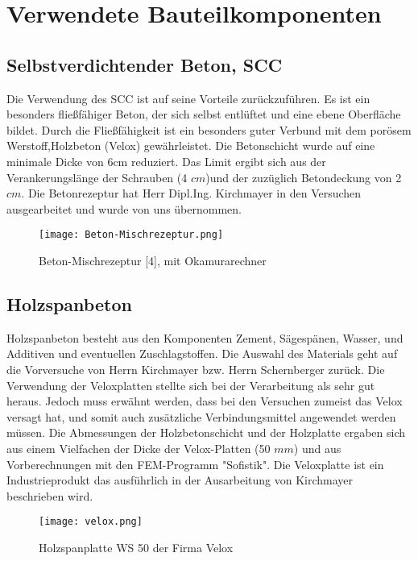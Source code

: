 \documentclass[12 pt,a4 paper ]{scrreprt}
\begin{document}
\section{Verwendete Bauteilkomponenten}
\subsection{Selbstverdichtender Beton, SCC}

Die Verwendung des SCC ist auf seine Vorteile zurückzuführen. Es ist ein besonders fließfähiger Beton, der sich selbst entlüftet und eine ebene Oberfläche bildet. Durch die Fließfähigkeit ist ein besonders guter Verbund mit dem porösem Werstoff,Holzbeton (Velox) gewährleistet. Die Betonschicht wurde auf eine minimale Dicke von 6cm reduziert. Das Limit ergibt sich aus der Verankerungslänge der Schrauben (4 $cm$)und der zuzüglich  Betondeckung von 2 $ cm $. Die Betonrezeptur hat Herr Dipl.Ing. Kirchmayer in den Versuchen ausgearbeitet und wurde von uns übernommen.


\begin{figure}[h]
\begin{center}
\texttt{[image: Beton-Mischrezeptur.png]}
\caption{Beton-Mischrezeptur [4], mit Okamurarechner}
\label{Beton-Mischrezeptur}
\end{center}
\end{figure}


\subsection{Holzspanbeton}

Holzspanbeton besteht aus den Komponenten Zement, Sägespänen, Wasser, und Additiven und eventuellen Zuschlagstoffen. Die Auswahl des Materials geht auf die Vorversuche von Herrn Kirchmayer bzw. Herrn Schernberger zurück. Die Verwendung der Veloxplatten stellte sich bei der Verarbeitung als sehr gut heraus. Jedoch muss erwähnt werden, dass bei den Versuchen zumeist das Velox versagt hat, und somit auch zusätzliche Verbindungsmittel angewendet werden müssen.
Die Abmessungen der Holzbetonschicht und der Holzplatte ergaben sich aus einem Vielfachen der Dicke der Velox-Platten (50 $mm$) und aus Vorberechnungen mit den FEM-Programm "Sofistik". Die Veloxplatte ist ein Industrieprodukt das ausführlich in der Ausarbeitung von Kirchmayer beschrieben wird.


\begin{figure}[h]
\begin{center}
\texttt{[image: velox.png]}
\caption{Holzspanplatte WS 50 der Firma Velox}
\label{velox}
\end{center}
\end{figure}
\end{document}

